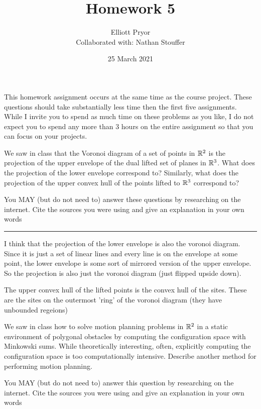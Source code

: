 \documentclass[11pt]{article}
\title{Homework 5}
\author{Elliott Pryor \\
Collaborated with: Nathan Stouffer}
\date{25 March 2021}
\begin{document}
\maketitle

This homework assignment occurs at the same time as the course project.  These
questions should take substantially less time then the first five assignments.
While I invite you to spend as much time on these problems as you like, I do not
expect you to spend any more than 3 hours on the entire assignment so that you
can focus on your projects.



We saw in class that the Voronoi diagram of a set of points in $\mathbb{R}^2$ is the
projection of the upper envelope of the dual lifted set of planes in $\mathbb{R}^3$.
What does the projection of the lower envelope correspond to? Similarly, what
does the projection of the upper convex hull of the points lifted to $\mathbb{R}^3$
correspond to?

You MAY (but do not need to) answer these questions by researching on the
internet. Cite the sources you were using and give an explanation in your own
words

\hrule

I think that the projection of the lower envelope is also the voronoi diagram. 
Since it is just a set of linear lines and every line is on the envelope at some point,
the lower envelope is some sort of mirrored version of the upper envelope. 
So the projection is also just the voronoi diagram (just flipped upside down).

The upper convex hull of the lifted points is the convex hull of the sites.
These are the sites on the outermost 'ring' of the voronoi diagram (they have unbounded regeions)












We saw in class how to solve motion planning problems in $\mathbb{R}^2$ in a static
environment of polygonal obstacles by computing the configuration space with
Minkowski sums.  While theoretically interesting, often, explicitly computing
the configuration space is too computationally intensive.  Describe another
method for performing motion planning.

You MAY (but do not need to) answer this question by researching on the
internet. Cite the sources you were using and give an explanation in your own
words
\end{document}
